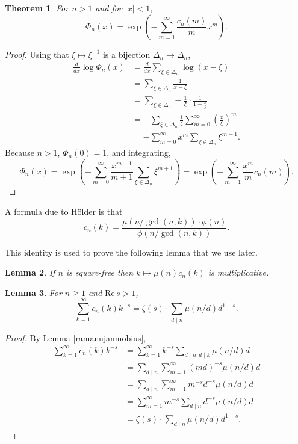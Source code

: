 \documentclass{amsart}
\def\Re{\ensuremath{\mathrm{Re}}\,}
\newtheorem{theorem}{Theorem}
\newtheorem{lemma}[theorem]{Lemma}
\theoremstyle{definition}
\begin{document}
\begin{theorem}
For $n>1$ and for $|x|<1$,
\[
\Phi_n(x) = \exp\left(
-\sum_{m=1}^\infty \frac{c_n(m)}{m} x^m\right).
\]
\label{ramanujanexp}
\end{theorem}
\begin{proof}
Using that $\xi \mapsto \xi^{-1}$ is a bijection $\Delta_n \to \Delta_n$,
\begin{align*}
 \frac{d}{dx} \log \Phi_n(x)&=\frac{d}{dx} \sum_{\xi \in \Delta_n} \log (x-\xi)\\
&=\sum_{\xi \in \Delta_n} \frac{1}{x-\xi}\\
&=\sum_{\xi \in \Delta_n} -\frac{1}{\xi} \cdot \frac{1}{1-\frac{x}{\xi}}\\
&=- \sum_{\xi \in \Delta_n} \frac{1}{\xi} \sum_{m=0}^\infty \left(\frac{x}{\xi}\right)^m\\
&=-\sum_{m=0}^\infty x^m \sum_{\xi \in \Delta_n} \xi^{m+1}.
\end{align*}
Because $n>1$, $\Phi_n(0)=1$, and integrating,
\[
\Phi_n(x) = \exp\left( -\sum_{m=0}^\infty \frac{x^{m+1}}{m+1} \sum_{\xi \in \Delta_n} \xi^{m+1}\right)
=\exp\left(-\sum_{m=1}^\infty \frac{x^m}{m} c_n(m)\right).
\]
\end{proof}


A formula due to H\"older \cite[p.~110, Theorem 4.1]{montgomery} is that  
\begin{equation}
c_n(k) = \frac{\mu(n/\gcd(n,k))\cdot \phi(n)}{\phi(n/\gcd(n,k))}.
\label{holder}
\end{equation}

This identity is used to prove the following lemma that we  use later.

\begin{lemma}
If $n$ is square-free then $k \mapsto \mu(n) c_n(k)$ is multiplicative. 
\label{squarefree}
\end{lemma}



\begin{lemma}
For $n \geq 1$ and $\Re s>1$,
\[
\sum_{k=1}^\infty c_n(k) k^{-s} = \zeta(s) \cdot \sum_{d \mid n} \mu(n/d) d^{1-s}.
\]
\label{ramanujandirichlet}
\end{lemma}
\begin{proof}
By Lemma \ref{ramanujanmobius},
\begin{align*}
\sum_{k=1}^\infty c_n(k) k^{-s} &=\sum_{k=1}^\infty k^{-s} \sum_{d \mid n, d \mid k} \mu(n/d) d\\
&=\sum_{d \mid n} \sum_{m=1}^\infty (md)^{-s} \mu(n/d) d\\
&=\sum_{d \mid n} \sum_{m=1}^\infty m^{-s} d^{-s} \mu(n/d) d\\
&=\sum_{m=1}^\infty m^{-s} \sum_{d \mid n} d^{-s} \mu(n/d) d\\
&=\zeta(s) \cdot \sum_{d \mid n} \mu(n/d) d^{1-s}.
\end{align*}
\end{proof}
\end{document}
